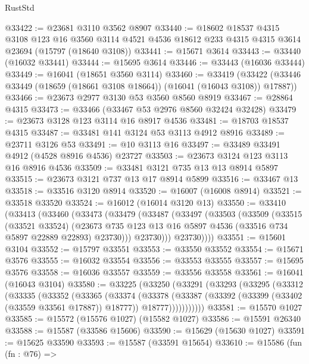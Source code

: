 \begin{lexlean}{RustStd}
\begin{coremodule}
@33422 := @23681 @3110 @3562 @8907
@33440 := @18602
    @18537
    @4315
    @3108
    @123
    @16
    @3560
    @3114
    @4521
    @4536
    @18612
    @233
    @4315
    @4315
    @3614
    @23694
    (@15797 (@18640 @3108))
@33441 := @15671 @3614
@33443 := @33440 (@16032 @33441)
@33444 := @15695 @3614
@33446 := @33443 (@16036 @33444)
@33449 := @16041 (@18651 @3560 @3114)
@33460 := @33419
    (@33422 (@33446 @33449 (@18659 (@18661 @3108 @18664)) (@16041 (@16043 @3108)) @17887))
@33466 := @23673 @2977 @3130 @53 @3560 @8560 @8919
@33467 := @28864 @4315
@33473 := @33466 (@33467 @53 @2976 @8560 @32424 @32428)
@33479 := @23673 @3128 @123 @3114 @16 @8917 @4536
@33481 := @18703 @18537 @4315
@33487 := @33481 @141 @3124 @53 @3113 @4912 @8916
@33489 := @23711 @3126 @53
@33491 := @10 @3113 @16
@33497 := @33489 @33491 @4912 (@4528 @8916 @4536) @23727
@33503 := @23673 @3124 @123 @3113 @16 @8916 @4536
@33509 := @33481 @3121 @735 @13 @13 @8914 @5897
@33515 := @23673 @3121 @737 @13 @17 @8914 @5899
@33516 := @33467 @13
@33518 := @33516 @3120 @8914
@33520 := @16007 (@16008 @8914)
@33521 := @33518 @33520
@33524 := @16012 (@16014 @3120 @13)
@33550 := @33410
    (@33413
      (@33460
        (@33473
          (@33479
            (@33487
              (@33497
                (@33503
                  (@33509
                    (@33515
                      (@33521 @33524)
                      (@23673
                        @735
                        @123
                        @13
                        @16
                        @5897
                        @4536
                        (@33516 @734 @5897 @22889 @22893)
                        @23730)))
                  @23730)))
            @23730))))
@33551 := @15601 @3104
@33552 := @15797 @33551
@33553 := @33550 @33552
@33554 := @15671 @3576
@33555 := @16032 @33554
@33556 := @33553 @33555
@33557 := @15695 @3576
@33558 := @16036 @33557
@33559 := @33556 @33558
@33561 := @16041 (@16043 @3104)
@33580 := @33225
    (@33250
      (@33291
        (@33293
          (@33295
            (@33312
              (@33335
                (@33352
                  (@33365
                    (@33374
                      (@33378
                        (@33387
                          (@33392 (@33399 (@33402 (@33559 @33561 @17887)) @18777))
                          @18777)))))))))))
@33581 := @15570 @1027
@33585 := @15572 (@15576 @1027) (@15582 @1027)
@33586 := @15591 @26340
@33588 := @15587 (@33586 @15606)
@33590 := @15629 (@15630 @1027)
@33591 := @15625 @33590
@33593 := @15587 (@33591 @15654)
@33610 := @15586
    (fun (fn : @76) =>

\end{coremodule}
\end{lexlean}
